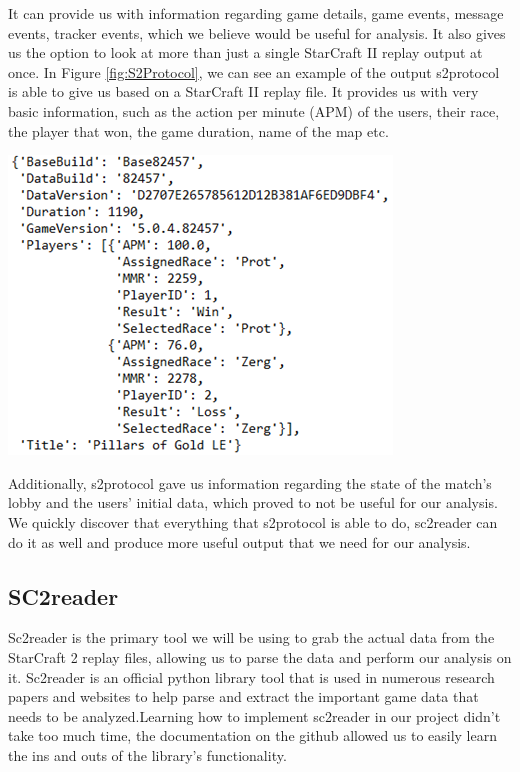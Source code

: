 \documentclass[a4paper,12pt]{report}
\begin{document}
It can provide us with information regarding game details, game events, message events, tracker events, which we believe would be useful for analysis. It also gives us the option to look at more than just a single StarCraft II replay output at once. In Figure \ref{fig:S2Protocol}, we can see an example of the output s2protocol is able to give us based on a StarCraft II replay file. It provides us with very basic information, such as the action per minute (APM) of the users, their race, the player that won, the game duration, name of the map etc.

\begin{center}
    \captionsetup{type=figure}
    \includegraphics[width=.7\linewidth]{media/S2Protocol.png}
    \label{fig:S2Protocol}
\end{center}

Additionally, s2protocol gave us information regarding the state of the match’s lobby and the users’ initial data, which proved to not be useful for our analysis. We quickly discover that everything that s2protocol is able to do, sc2reader can do it as well and produce more useful output that we need for our analysis. 

\subsection{SC2reader}
Sc2reader is the primary tool we will be using to grab the actual data from the StarCraft 2 replay files, allowing us to parse the data and perform our analysis on it. Sc2reader is an official python library tool that is used in numerous research papers and websites to help parse and extract the important game data that needs to be analyzed.Learning how to implement sc2reader in our project didn’t take too much time, the documentation on the github allowed us to easily learn the ins and outs of the library's functionality.
\end{document}
